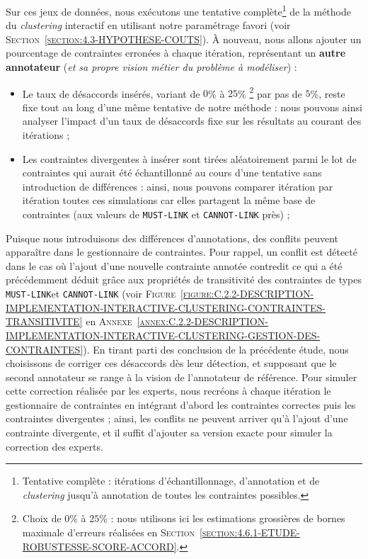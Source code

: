 			Sur ces jeux de données, nous exécutons une tentative complète\footnote{
				Tentative complète : itérations d'échantillonnage, d'annotation et de \textit{clustering} jusqu'à annotation de toutes les contraintes possibles.
			}
			de la méthode du \textit{clustering} interactif en utilisant notre paramétrage favori (voir \textsc{Section~\ref{section:4.3-HYPOTHESE-COUTS}}).
			À nouveau, nous allons ajouter un pourcentage de contraintes erronées à chaque itération, représentant un \textbf{autre annotateur} (\textit{et sa propre vision métier du problème à modéliser}) :
			\begin{itemize}
				\item Le taux de désaccords insérés, variant de $0$\% à $25$\% \footnote{
					Choix de $0$\% à $25$\% : nous utilisons ici les estimations grossières de bornes maximale d'erreurs réalisées en \textsc{Section~\ref{section:4.6.1-ETUDE-ROBUSTESSE-SCORE-ACCORD}}.
				} par pas de $5$\%, reste fixe tout au long d'une même tentative de notre méthode : nous pouvons ainsi analyser l'impact d'un taux de désaccords fixe sur les résultats au courant des itérations ;
				\item Les contraintes divergentes à insérer sont tirées aléatoirement parmi le lot de contraintes qui aurait été échantillonné au cours d'une tentative sans introduction de différences : ainsi, nous pouvons comparer itération par itération toutes ces simulations car elles partagent la même base de contraintes (aux valeurs de \texttt{MUST-LINK} et \texttt{CANNOT-LINK} près) ;
			\end{itemize}
			
			Puisque nous introduisons des différences d'annotations, des conflits peuvent apparaître dans le gestionnaire de contraintes.
			Pour rappel, un conflit est détecté dans le cas où l'ajout d'une nouvelle contrainte annotée contredit ce qui a été précédemment déduit grâce aux propriétés de transitivité des contraintes de types \texttt{MUST-LINK}et \texttt{CANNOT-LINK} (voir \textsc{Figure~\ref{figure:C.2.2-DESCRIPTION-IMPLEMENTATION-INTERACTIVE-CLUSTERING-CONTRAINTES-TRANSITIVITE}} en \textsc{Annexe~\ref{annex:C.2.2-DESCRIPTION-IMPLEMENTATION-INTERACTIVE-CLUSTERING-GESTION-DES-CONTRAINTES}}).
			En tirant parti des conclusion de la précédente étude, nous choisissons de corriger ces désaccords dès leur détection, et supposant que le second annotateur se range à la vision de l'annotateur de référence.
			Pour simuler cette correction réalisée par les experts, nous recréons à chaque itération le gestionnaire de contraintes en intégrant d'abord les contraintes correctes puis les contraintes divergentes ; ainsi, les conflits ne peuvent arriver qu'à l'ajout d'une contrainte divergente, et il suffit d'ajouter sa version exacte pour simuler la correction des experts.
			
